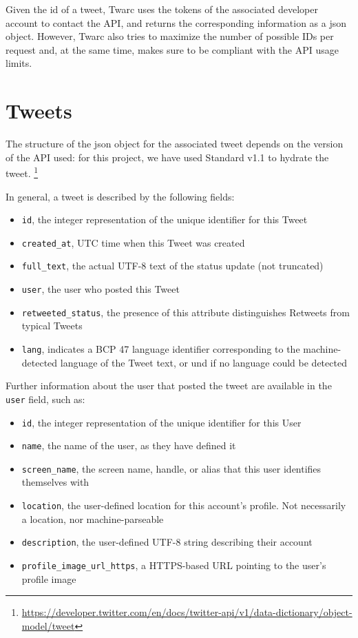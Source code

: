 Given the id of a tweet, Twarc uses the tokens of the associated developer account to contact the API, and returns the corresponding information as a json object. However, Twarc also tries to maximize the number of possible IDs per request and, at the same time, makes sure to be compliant with the API usage limits.

\section{Tweets}
\label{sec:tweets}
The structure of the json object for the associated tweet depends on the version of the API used: for this project, we have used Standard v1.1 to hydrate the tweet. \footnote{\url{https://developer.twitter.com/en/docs/twitter-api/v1/data-dictionary/object-model/tweet}}

In general, a tweet is described by the following fields:

\begin{itemize}
	\item \texttt{id}, the integer representation of the unique identifier for this Tweet
	\item \texttt{created\_at}, UTC time when this Tweet was created
	\item \texttt{full\_text}, the actual UTF-8 text of the status update (not truncated)
	\item \texttt{user}, the user who posted this Tweet
	\item \texttt{retweeted\_status}, the presence of this attribute distinguishes Retweets from typical Tweets
	\item \texttt{lang}, indicates a BCP 47 language identifier corresponding to the machine-detected language of the Tweet text, or und if no language could be detected
\end{itemize}

Further information about the user that posted the tweet are available in the \texttt{user} field, such as:

\begin{itemize}
	\item \texttt{id}, the integer representation of the unique identifier for this User
	\item \texttt{name}, the name of the user, as they have defined it
	\item \texttt{screen\_name}, the screen name, handle, or alias that this user identifies themselves with
	\item \texttt{location}, the user-defined location for this account's profile. Not necessarily a location, nor machine-parseable
	\item \texttt{description}, the user-defined UTF-8 string describing their account
	\item \texttt{profile\_image\_url\_https}, a HTTPS-based URL pointing to the user's profile image
\end{itemize}

